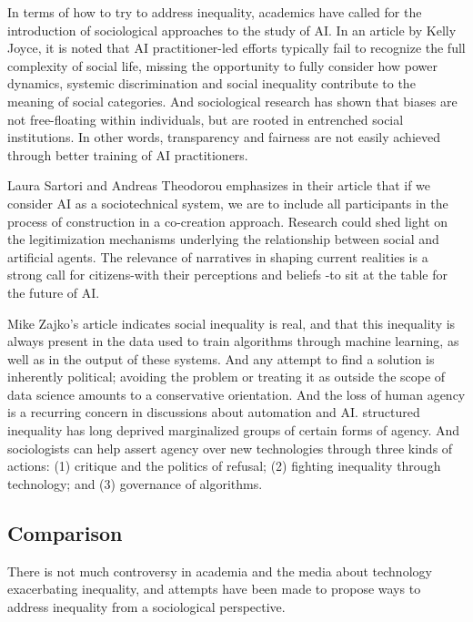\documentclass[11pt]{article}
\begin{document}
In terms of how to try to address inequality, academics have called for the introduction of sociological approaches to the study of AI. In an article\cite{joyce2021toward} by Kelly Joyce, it is noted that AI practitioner-led efforts typically fail to recognize the full complexity of social life, missing the opportunity to fully consider how power dynamics, systemic discrimination and social inequality contribute to the meaning of social categories.
And sociological research has shown that biases are not free-floating within individuals, but are rooted in entrenched social institutions. In other words, transparency and fairness are not easily achieved through better training of AI practitioners.


Laura Sartori and Andreas Theodorou emphasizes in their article\cite{sartori2022sociotechnical} that if we consider AI as a sociotechnical system, we are to include all participants in the process of construction in a co-creation approach. Research could shed light on the legitimization mechanisms underlying the relationship between social and artificial agents. The relevance of narratives in shaping current realities is a strong call for citizens-with their perceptions and beliefs -to sit at the table for the future of AI.


Mike Zajko's article\cite{zajko2022artificial} indicates social inequality is real, and that this inequality is always present in the data used to train algorithms through machine learning, as well as in the output of these systems. And any attempt to find a solution is inherently political; avoiding the problem or treating it as outside the scope of data science amounts to a conservative orientation. And the loss of human agency is a recurring concern in discussions about automation and AI. structured inequality has long deprived marginalized groups of certain forms of agency. And sociologists can help assert agency over new technologies through three kinds of actions: (1) critique and the politics of refusal; (2) fighting inequality through technology; and (3) governance of algorithms.

\subsection{Comparison}

There is not much controversy in academia and the media about technology exacerbating inequality, and attempts have been made to propose ways to address inequality from a sociological perspective.
\end{document}
